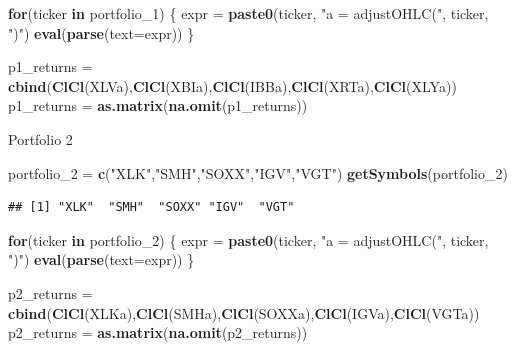 \documentclass[]{article}
\newenvironment{Shaded}{\begin{snugshade}}{\end{snugshade}}
\newcommand{\ControlFlowTok}[1]{\textcolor[rgb]{0.13,0.29,0.53}{\textbf{#1}}}
\newcommand{\DataTypeTok}[1]{\textcolor[rgb]{0.13,0.29,0.53}{#1}}
\newcommand{\DecValTok}[1]{\textcolor[rgb]{0.00,0.00,0.81}{#1}}
\newcommand{\KeywordTok}[1]{\textcolor[rgb]{0.13,0.29,0.53}{\textbf{#1}}}
\newcommand{\NormalTok}[1]{#1}
\newcommand{\StringTok}[1]{\textcolor[rgb]{0.31,0.60,0.02}{#1}}
\begin{document}
\begin{Shaded}
\begin{Highlighting}[]
\ControlFlowTok{for}\NormalTok{(ticker }\ControlFlowTok{in}\NormalTok{ portfolio_}\DecValTok{1}\NormalTok{) \{}
\NormalTok{  expr =}\StringTok{ }\KeywordTok{paste0}\NormalTok{(ticker, }\StringTok{"a = adjustOHLC("}\NormalTok{, ticker, }\StringTok{")"}\NormalTok{)}
  \KeywordTok{eval}\NormalTok{(}\KeywordTok{parse}\NormalTok{(}\DataTypeTok{text=}\NormalTok{expr))}
\NormalTok{\}}

\NormalTok{p1_returns =}\StringTok{ }\KeywordTok{cbind}\NormalTok{(}\KeywordTok{ClCl}\NormalTok{(XLVa),}\KeywordTok{ClCl}\NormalTok{(XBIa),}\KeywordTok{ClCl}\NormalTok{(IBBa),}\KeywordTok{ClCl}\NormalTok{(XRTa),}\KeywordTok{ClCl}\NormalTok{(XLYa))}
\NormalTok{p1_returns =}\StringTok{ }\KeywordTok{as.matrix}\NormalTok{(}\KeywordTok{na.omit}\NormalTok{(p1_returns))}
\end{Highlighting}
\end{Shaded}

Portfolio 2

\begin{Shaded}
\begin{Highlighting}[]
\NormalTok{portfolio_}\DecValTok{2}\NormalTok{ =}\StringTok{ }\KeywordTok{c}\NormalTok{(}\StringTok{"XLK"}\NormalTok{,}\StringTok{"SMH"}\NormalTok{,}\StringTok{"SOXX"}\NormalTok{,}\StringTok{"IGV"}\NormalTok{,}\StringTok{"VGT"}\NormalTok{)}
\KeywordTok{getSymbols}\NormalTok{(portfolio_}\DecValTok{2}\NormalTok{)}
\end{Highlighting}
\end{Shaded}

\begin{verbatim}
## [1] "XLK"  "SMH"  "SOXX" "IGV"  "VGT"
\end{verbatim}

\begin{Shaded}
\begin{Highlighting}[]
\ControlFlowTok{for}\NormalTok{(ticker }\ControlFlowTok{in}\NormalTok{ portfolio_}\DecValTok{2}\NormalTok{) \{}
\NormalTok{  expr =}\StringTok{ }\KeywordTok{paste0}\NormalTok{(ticker, }\StringTok{"a = adjustOHLC("}\NormalTok{, ticker, }\StringTok{")"}\NormalTok{)}
  \KeywordTok{eval}\NormalTok{(}\KeywordTok{parse}\NormalTok{(}\DataTypeTok{text=}\NormalTok{expr))}
\NormalTok{\}}

\NormalTok{p2_returns =}\StringTok{ }\KeywordTok{cbind}\NormalTok{(}\KeywordTok{ClCl}\NormalTok{(XLKa),}\KeywordTok{ClCl}\NormalTok{(SMHa),}\KeywordTok{ClCl}\NormalTok{(SOXXa),}\KeywordTok{ClCl}\NormalTok{(IGVa),}\KeywordTok{ClCl}\NormalTok{(VGTa))}
\NormalTok{p2_returns =}\StringTok{ }\KeywordTok{as.matrix}\NormalTok{(}\KeywordTok{na.omit}\NormalTok{(p2_returns))}
\end{Highlighting}
\end{Shaded}
\end{document}
